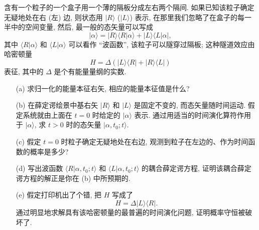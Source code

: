 \documentclass{assignment}
\begin{document}
\begin{prob}[课本习题 2.10]
    含有一个粒子的一个盒子用一个薄的隔板分成左右两个隔间. 如果已知该粒子确定无疑地处在右 (左) 边, 则状态用 $\lvert R\rangle$ ($\lvert L\rangle$) 表示, 在那里我们忽略了在盒子的每一半中的空间变量, 然后, 最一般的态矢量可以写成
    \[
        \lvert\alpha\rangle=\lvert R\rangle\langle R\vert\alpha\rangle+\lvert L\rangle\langle L\vert\alpha\rvert,
    \]
    其中 $\langle R\vert\alpha\rangle$ 和 $\langle L\vert\alpha\rangle$ 可以看作 ``波函数'', 该粒子可以隧穿过隔板; 这种隧道效应由哈密顿量
    \[
        H=\Delta(\lvert L\rangle\langle R\rvert+\lvert R\rangle\langle L\rvert)
    \]
    表征, 其中的 $\Delta$ 是个有能量量纲的实数.
    \begin{itemize}
        \item[(a)] 求归一化的能量本征右矢, 相应的能量本征值是什么?
        \item[(b)] 在薛定谔绘景中基右矢 $\lvert R\rangle$ 和 $\lvert L\rangle$ 是固定不变的, 而态矢量随时间运动. 假定系统就由上面在 $t=0$ 时给定的 $\lvert\alpha\rangle$ 表示. 通过用适当的时间演化算符作用于 $\lvert\alpha\rangle$, 求 $t>0$ 时的态矢量 $\lvert\alpha,t_0;t\rangle$.
        \item[(c)] 假定 $t=0$ 时粒子确定无疑地处在右边, 观测到粒子在左边的、作为时间函数的概率是多少?
        \item[(d)] 写出波函数 $\langle R\vert\alpha,t_0;t\rangle$ 和 $\langle L\vert\alpha,t_0;t\rangle$ 的耦合薛定谔方程, 证明该耦合薛定谔方程的解正是你在 (b) 中所预期的.
        \item[(e)] 假定打印机出了个错, 把 $H$ 写成了
        \[
            H=\Delta\lvert L\rangle\langle R\rvert.
        \]
        通过明显地求解具有该哈密顿量的最普遍的时间演化问题, 证明概率守恒被破坏了.
    \end{itemize}
\end{prob}
\end{document}
